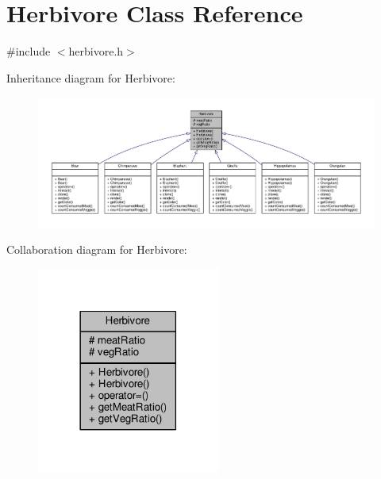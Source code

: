 \hypertarget{classHerbivore}{}\section{Herbivore Class Reference}
\label{classHerbivore}


{\ttfamily \#include $<$herbivore.\+h$>$}



Inheritance diagram for Herbivore\+:
\nopagebreak
\begin{figure}[H]
\begin{center}
\leavevmode
\includegraphics[width=350pt]{classHerbivore__inherit__graph}
\end{center}
\end{figure}


Collaboration diagram for Herbivore\+:
\nopagebreak
\begin{figure}[H]
\begin{center}
\leavevmode
\includegraphics[width=170pt]{classHerbivore__coll__graph}
\end{center}
\end{figure}
